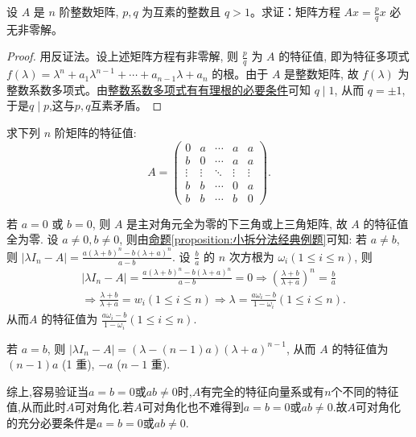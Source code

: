 \documentclass[../../main.tex]{subfiles}
\begin{document}
\begin{example}
设 $A$ 是 $n$ 阶整数矩阵, $p, q$ 为互素的整数且 $q > 1$。求证：矩阵方程 $Ax = \frac{p}{q} x$ 必无非零解。
\end{example}
\begin{proof}
用反证法。设上述矩阵方程有非零解, 则 $\frac{p}{q}$ 为 $A$ 的特征值, 即为特征多项式 $f(\lambda) = \lambda^n + a_1 \lambda^{n-1} + \cdots + a_{n-1} \lambda + a_n$ 的根。由于 $A$ 是整数矩阵, 故 $f(\lambda)$ 为整数系数多项式。由\hyperref[theorem:整数系数多项式有有理根的必要条件]{整数系数多项式有有理根的必要条件}可知 $q \mid 1$, 从而 $q = \pm 1$,于是$q\mid p$,这与$p,q$互素矛盾。

\end{proof}

\begin{example}
求下列 $n$ 阶矩阵的特征值:
\[
A = \begin{pmatrix}
0 & a & \cdots & a & a \\
b & 0 & \cdots & a & a \\
\vdots & \vdots & \ddots & \vdots & \vdots \\
b & b & \cdots & 0 & a \\
b & b & \cdots & b & 0
\end{pmatrix}.
\]
\end{example}
\begin{solution}
若 $a = 0$ 或 $b = 0$, 则 $A$ 是主对角元全为零的下三角或上三角矩阵, 故 $A$ 的特征值全为零. 设 $a \neq 0, b \neq 0$, 则由\hyperref[proposition:小拆分法经典例题]{命题\ref{proposition:小拆分法经典例题}}可知:
若 $a \neq b$, 则 $|\lambda I_n-A|=\frac{a(\lambda +b)^n-b(\lambda +a)^n}{a-b}$. 设 $\frac{b}{a}$ 的 $n$ 次方根为 $\omega_i (1 \leqslant  i \leqslant  n)$, 则
\begin{align*}
&|\lambda I_n-A|=\frac{a(\lambda +b)^n-b(\lambda +a)^n}{a-b}=0\Rightarrow \left( \frac{\lambda +b}{\lambda +a} \right) ^n=\frac{b}{a}
\\
&\Rightarrow \frac{\lambda +b}{\lambda +a}=w_i\left( 1\le i\le n \right) \Rightarrow \lambda =\frac{a\omega _i-b}{1-\omega _i}(1\le i\le n).
\end{align*}
从而$A$ 的特征值为 $\frac{a \omega_i - b}{1 - \omega_i} (1 \leqslant  i \leqslant  n)$.

若 $a = b$, 则 $|\lambda I_n - A| = (\lambda - (n - 1)a)(\lambda + a)^{n-1}$, 从而 $A$ 的特征值为 $(n - 1)a$ (1 重), $-a$ ($n - 1$ 重).

综上,容易验证当$a=b=0$或$ab\ne0$时,$A$有完全的特征向量系或有$n$个不同的特征值,从而此时$A$可对角化.若$A$可对角化也不难得到$a=b=0$或$ab\ne0$.故$A$可对角化的充分必要条件是$a=b=0$或$ab\ne0$.

\end{solution}
\end{document}
